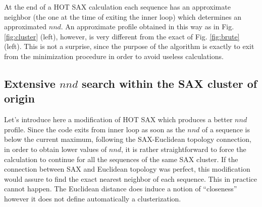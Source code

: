 \documentclass[a4paper,twoside]{article}
\begin{document}
At the end of a HOT SAX calculation each sequence has an approximate neighbor (the one at the time of exiting the inner loop) which determines an approximated $nnd$. 
An approximate profile obtained in this way as in Fig. \ref{fig:cluster} (left), however, is very different from the exact of Fig. \ref{fig:brute} (left). This is not a surprise, since the purpose of the algorithm is exactly to exit from the minimization procedure in order to avoid useless calculations.


\subsection{Extensive $nnd$ search within the SAX cluster of origin }\label{ssec:extensive}
Let's introduce here a modification of HOT SAX which produces a better $nnd$ profile. 
%
%
Since the code exits from inner loop as soon as the $nnd$ of a sequence is below the current maximum, following the SAX-Euclidean topology connection, in order to obtain lower values of $nnd$, it is rather straightforward to force the calculation to continue for all the sequences of the same SAX cluster. 
If the connection between SAX and Euclidean topology was perfect, this modification would assure to find the exact nearest neighbor of each sequence.
This in practice cannot happen. The Euclidean distance does induce a notion of ``closeness'' however it does not define automatically a clusterization. %
\end{document}
